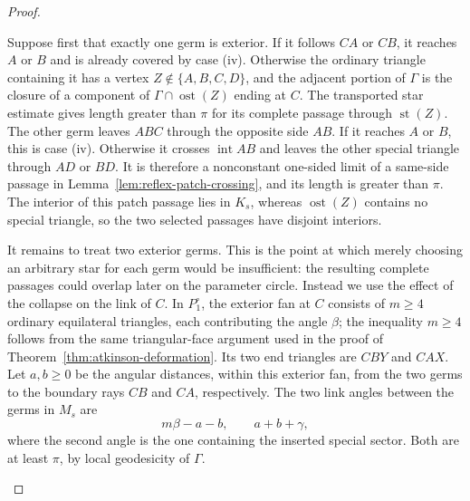 \documentclass[12pt,a4paper]{article}
\theoremstyle{definition}
\begin{document}
\begin{proof}
\begin{enumerate}[label=\textup{(\roman*)},itemsep=0.35em,topsep=0.4em]
Suppose first that exactly one germ is exterior.  If it follows \(CA\) or
\(CB\), it reaches \(A\) or \(B\) and is already covered by case
\textup{(iv)}.  Otherwise the ordinary triangle containing it has a vertex
\(Z\notin\{A,B,C,D\}\), and the adjacent portion of
\(\Gamma\) is the closure of a component of
\(\Gamma\cap\operatorname{ost}(Z)\) ending at \(C\).  The transported star
estimate gives length greater than \(\pi\) for its complete passage through
\(\operatorname{st}(Z)\).  The other germ leaves \(ABC\) through the opposite
side \(AB\). If it reaches \(A\) or \(B\), this is case \textup{(iv)}.
Otherwise it crosses \(\operatorname{int}AB\) and leaves the other special
triangle through \(AD\) or \(BD\). It is therefore a nonconstant one-sided
limit of a same-side passage in
Lemma~\ref{lem:reflex-patch-crossing}, and its length is greater than \(\pi\).
The interior of this patch passage lies in \(K_s\), whereas
\(\operatorname{ost}(Z)\) contains no special triangle, so the two selected
passages have disjoint interiors.

It remains to treat two exterior germs.  This is the point at which merely
choosing an arbitrary star for each germ would be insufficient: the resulting
complete passages could overlap later on the parameter circle.  Instead we use
the effect of the collapse on the link of \(C\).  In \(P_1^\circ\), the
exterior fan at \(C\) consists of \(m\ge4\) ordinary equilateral triangles,
each contributing the angle \(\beta\); the inequality \(m\ge4\) follows from
the same triangular-face argument used in the proof of
Theorem~\ref{thm:atkinson-deformation}.  Its two end triangles are \(CBY\) and
\(CAX\).  Let \(a,b\ge0\) be the angular distances, within this exterior fan,
from the two germs to the boundary rays \(CB\) and \(CA\), respectively.  The
two link angles between the germs in \(M_s\) are
\begin{equation}\label{eq:two-exterior-link-angles}
        m\beta-a-b,
        \qquad
        a+b+\gamma,
\end{equation}
where the second angle is the one containing the inserted special sector.
Both are at least \(\pi\), by local geodesicity of \(\Gamma\).


\end{enumerate}
\end{proof}
\end{document}
